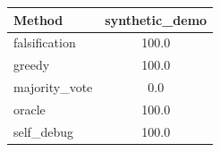 \begin{tabular}{lc}
\toprule
Method & synthetic_demo \\
\midrule
falsification & 100.0 \\
greedy & 100.0 \\
majority_vote & 0.0 \\
oracle & 100.0 \\
self_debug & 100.0 \\
\bottomrule
\end{tabular}
